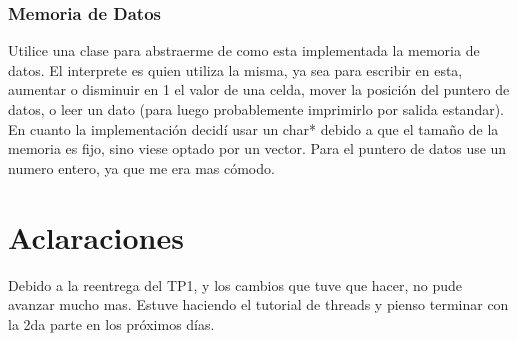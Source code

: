 \documentclass[titlepage,a4paper]{article}
\begin{document}
\subsubsection{Memoria de Datos}

Utilice una clase para abstraerme de como esta implementada la memoria de datos. El interprete es quien utiliza la misma, ya sea para escribir en esta, aumentar o disminuir en 1 el valor de una celda, mover la posición del puntero de datos, o leer un dato (para luego probablemente imprimirlo por salida estandar). En cuanto la implementación decidí usar un char* debido a que el tamaño de la memoria es fijo, sino viese optado por un vector. Para el puntero de datos use un numero entero, ya que me era mas cómodo.

\section{Aclaraciones}

Debido a la reentrega del TP1, y los cambios que tuve que hacer, no pude avanzar mucho mas. Estuve haciendo el tutorial de threads y pienso terminar con la 2da parte en los próximos días. 
\end{document}
